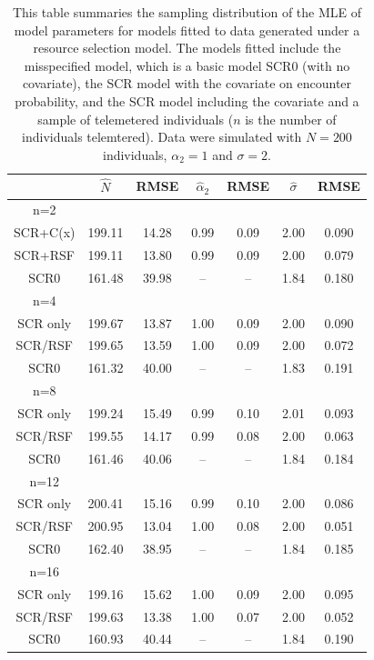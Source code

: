 \begin{table}[ht]
\centering
\caption{
  This table summaries the sampling distribution of the MLE of model
  parameters   for models fitted to data generated under a resource selection model.
  The models fitted   include the misspecified model, which is a basic model SCR0 (with no covariate), the SCR model with
  the covariate on encounter probability, and the SCR model including
  the covariate and a sample of telemetered individuals ($n$ is the
  number of individuals telemtered).    Data were simulated with   $N=200$ individuals,
  $\alpha_{2} = 1$ and $\sigma = 2$.
}
\begin{tabular}{ccccccc} \hline \hline 
        &  $\hat{N}$ &RMSE   &  $\hat{\alpha}_{2}$ &RMSE  &        $\hat{\sigma}$ & RMSE    \\ \hline
n=2     &       &       &       &      &        &         \\
SCR+C(x)& 199.11&  14.28&  0.99 &  0.09&   2.00 &  0.090  \\
SCR+RSF & 199.11&  13.80&  0.99 &  0.09&   2.00 &  0.079  \\
SCR0    & 161.48&  39.98&   --  &   -- &   1.84 &  0.180  \\ \hline
n=4   &       &      &        &    &        &          \\
SCR only& 199.67&  13.87&   1.00&   0.09 &  2.00&   0.090 \\
SCR/RSF & 199.65&  13.59&   1.00&   0.09 &  2.00&   0.072\\
SCR0    & 161.32&  40.00&    -- &    --  &  1.83&   0.191\\ \hline
n=8    &       &      &        &    &        &          \\
SCR only& 199.24&  15.49&   0.99&   0.10&   2.01&   0.093 \\
SCR/RSF & 199.55&  14.17&   0.99&   0.08&   2.00&   0.063\\
SCR0    & 161.46&  40.06&    -- &    -- &   1.84&   0.184\\ \hline
n=12    &       &      &        &    &        &          \\
SCR only& 200.41&  15.16&   0.99&   0.10&   2.00&   0.086\\
SCR/RSF & 200.95&  13.04&   1.00&   0.08&   2.00&   0.051\\
SCR0    & 162.40&  38.95&    -- &    -- &   1.84&   0.185\\ \hline
n=16     &       &      &        &    &        &          \\
SCR only &199.16 & 15.62&   1.00 &  0.09&   2.00&   0.095 \\
SCR/RSF  &199.63 & 13.38&   1.00 &  0.07&   2.00&   0.052\\
SCR0     &160.93 & 40.44&    --  &   -- &   1.84&   0.190\\ \hline
\end{tabular}
\label{rsf.tab.sims}
\end{table}
